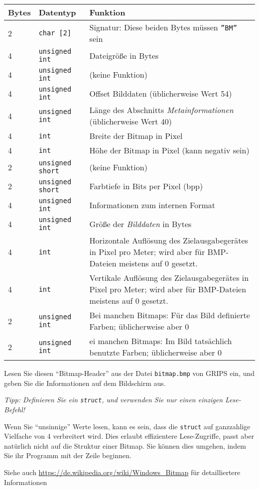 \documentclass[
	ngerman,
	fontsize=10pt,
	parskip=half,
	titlepage=true,
	DIV=12
]{scrartcl}
\begin{document}
\begin{tabular}{llp{10cm}}
	Bytes & Datentyp                       & Funktion \\ \hline
	2     & \texttt{char [2]}       & Signatur: Diese beiden Bytes müssen \texttt{''BM''} sein \\
	4     & \texttt{unsigned int}   & Dateigröße in Bytes\\
	4     & \texttt{unsigned int}   & (keine Funktion)\\
	4     & \texttt{unsigned int}   & Offset Bilddaten (üblicherweise Wert 54)\\
	
	4     & \texttt{unsigned int}   & Länge des Abschnitts \emph{Metainformationen} 
											(üblicherweise Wert 40)\\
    4     & \texttt{int}            & Breite der Bitmap in Pixel\\
    4     & \texttt{int}            & Höhe der Bitmap in Pixel (kann negativ sein)\\
	2     & \texttt{unsigned short} & (keine Funktion)\\
	2     & \texttt{unsigned short} & Farbtiefe in Bits per Pixel (bpp)\\
	4     & \texttt{unsigned int}   & Informationen zum internen Format\\
	4     & \texttt{unsigned int}   & Größe der \emph{Bilddaten} in Bytes\\
    4     & \texttt{int}            & Horizontale Auflösung des Zielausgabegerätes in Pixel pro
    											Meter; wird aber für BMP-Dateien meistens auf 0 gesetzt.\\
    4     & \texttt{int}            & Vertikale Auflösung des Zielausgabegerätes in Pixel pro
    											Meter; wird aber für BMP-Dateien meistens auf 0 gesetzt.\\
	2     & \texttt{unsigned int}   & Bei manchen Bitmaps: Für das Bild definierte Farben;
											üblicherweise aber 0\\
	2     & \texttt{unsigned int}   & ei manchen Bitmaps: Im Bild tatsächlich benutzte Farben;
											üblicherweise aber 0\\
\end{tabular}

Lesen Sie diesen \enquote{Bitmap-Header} aus der Datei \texttt{bitmap.bmp} von GRIPS ein, und geben Sie die Informationen auf dem Bildschirm aus.

\emph{Tipp: Definieren Sie ein \texttt{struct}, und verwenden Sie nur einen einzigen Lese-Befehl!}

Wenn Sie \enquote{unsinnige} Werte lesen, kann es sein, dass die \texttt{struct} auf ganzzahlige Vielfache von 4 verbreitert wird. Dies erlaubt effizientere Lese-Zugriffe, passt aber natürlich nicht auf die Struktur einer Bitmap. Sie können dies umgehen, indem Sie ihr Programm mit der Zeile
beginnen.

Siehe auch \url{https://de.wikipedia.org/wiki/Windows_Bitmap} für detailliertere Informationen
\end{document}

